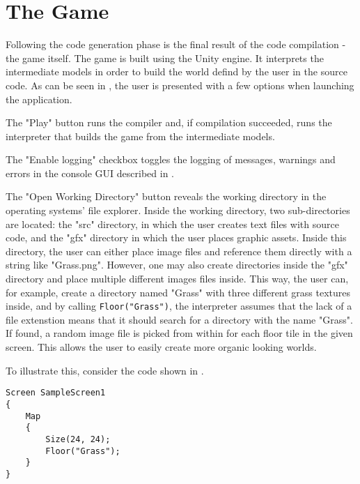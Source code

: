 \section{The Game} \label{sec:Interpreter}
Following the code generation phase is the final result of the code compilation - the game itself. 
The game is built using the Unity engine. It interprets the intermediate models in order to build the world defind by the user in the \dazel{} source code. As can be seen in , the user is presented with a few options when launching the application.

 
The "Play" button runs the \dazel{} compiler and, if compilation succeeded, runs the interpreter that builds the game from the intermediate models. 


The "Enable logging" checkbox toggles the logging of messages, warnings and errors in the console GUI described in .


The "Open Working Directory" button reveals the working directory in the operating systems' file explorer.
Inside the working directory, two sub-directories are located: the "src" directory, in which the user creates text files with source code, and the "gfx" directory in which the user places graphic assets. Inside this directory, the user can either place image files and reference them directly with a string like "Grass.png". However, one may also create directories inside the "gfx" directory and place multiple different images files inside. This way, the user can, for example, create a directory named "Grass" with three different grass textures inside, and by calling \texttt{Floor("Grass")}, the interpreter assumes that the lack of a file extenstion means that it should search for a directory with the name "Grass". If found, a random image file is picked from within for each floor tile in the given screen. This allows the user to easily create more organic looking worlds. 


To illustrate this, consider the \dazel{} code shown in .
\begin{lstlisting}[language=CSharp, caption={}, label={lst:DazelGrassExample},escapechar=|]
Screen SampleScreen1 
{
	Map 
	{
		Size(24, 24);
		Floor("Grass");
	}
}
\end{lstlisting}

